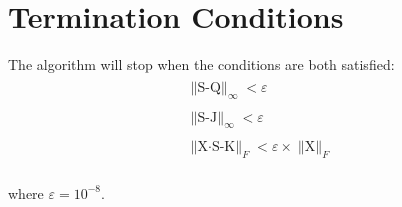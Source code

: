 \documentclass{article}
\begin{document}
\section{Termination Conditions}
The algorithm will stop when the conditions are both satisfied:
\begin{eqnarray}
\begin{array}{l}
\mathop{\parallel S-Q \parallel}_\infty < \varepsilon \\\\
\mathop{\parallel S-J \parallel}_\infty < \varepsilon \\\\
\mathop{\parallel X\cdot S-K \parallel}_F < \varepsilon \times \mathop{\parallel X \parallel}_F
\end{array}
\end{eqnarray}\\
where $\varepsilon = 10^{-8}$.\\
\end{document}
